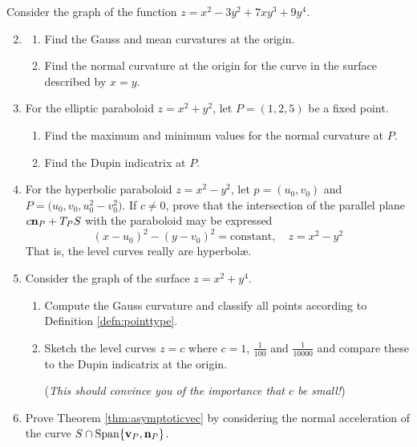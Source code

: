 \begin{exercises}{}{}
\exstart Consider the graph of the function $z=x^2-3y^2+7xy^3+9y^4$.
\begin{enumerate}\setcounter{enumi}{1}
  \item[]\begin{enumerate}
  	\item Find the Gauss and mean curvatures at the origin.
  	\item Find the normal curvature at the origin for the curve in the surface described by $x=y$.
  \end{enumerate}
  
  
  \item For the elliptic paraboloid $z=x^2+y^2$, let $P=(1,2,5)$ be a fixed point.
  \begin{enumerate}
    \item Find the maximum and minimum values for the normal curvature at $P$.
    \item Find the Dupin indicatrix at $P$.
  \end{enumerate}
  
  
  \item For the hyperbolic paraboloid $z=x^2-y^2$, let $p=(u_0,v_0)$ and $P=\bigl(u_0,v_0,u_0^2-v_0^2\bigr)$. If $c\neq 0$, prove that the intersection of the parallel plane $c{\mathbf{n}}_P+T_PS$ with the paraboloid may be expressed
  \[(x-u_0)^2-(y-v_0)^2=\text{constant},\quad z=x^2-y^2\]
  That is, the level curves really are hyperbolæ.


	\item Consider the graph of the surface $z=x^2+y^4$.
	\begin{enumerate}
	  \item Compute the Gauss curvature and classify all points according to Definition \ref{defn:pointtype}.
	  \item Sketch the level curves $z=c$ where $c=1$, $\frac 1{100}$ and $\frac 1{10000}$ and compare these to the Dupin indicatrix at the origin.\par
	  (\emph{This should convince you of the importance that $c$ be small!})
	\end{enumerate}
	
	
	\item Prove Theorem \ref{thm:asymptoticvec} by considering the normal acceleration of the curve $S\cap\operatorname{Span}\{{\mathbf{v}}_P,{\mathbf{n}}_P\}$.
	
\end{enumerate}
\end{exercises}


